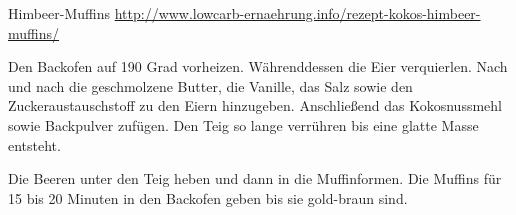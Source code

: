 \begin{recipe}[]{ Himbeer-Muffins }{\href{http://www.lowcarb-ernaehrung.info/rezept-kokos-himbeer-muffins/}{http://www.lowcarb-ernaehrung.info/rezept-kokos-himbeer-muffins/}}{ }



\step
Den Backofen auf 190 Grad vorheizen. Währenddessen die Eier verquierlen. Nach und nach die geschmolzene Butter, die Vanille, das Salz sowie den Zuckeraustauschstoff zu den Eiern hinzugeben. Anschließend das Kokosnussmehl sowie Backpulver zufügen. Den Teig so lange verrühren bis eine glatte Masse entsteht.


\step
Die Beeren unter den Teig heben und dann in die Muffinformen. Die Muffins für 15 bis 20 Minuten in den Backofen geben bis sie gold-braun sind.


\end{recipe}
